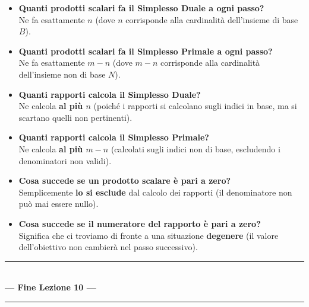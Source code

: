 \documentclass[12pt, a4paper]{article}
\begin{document}
	\begin{itemize}[label=\textcolor{titlecolor}{\Large\textbullet}, itemsep=6pt, leftmargin=1.5cm]
		\item \textbf{Quanti prodotti scalari fa il Simplesso Duale a ogni passo?} \\
		Ne fa esattamente \textbf{$n$} (dove $n$ corrisponde alla cardinalità dell'insieme di base $B$).
		
		\item \textbf{Quanti prodotti scalari fa il Simplesso Primale a ogni passo?} \\
		Ne fa esattamente \textbf{$m - n$} (dove $m - n$ corrisponde alla cardinalità dell'insieme non di base $N$).
		
		\item \textbf{Quanti rapporti calcola il Simplesso Duale?} \\
		Ne calcola \textbf{al più $n$} (poiché i rapporti si calcolano sugli indici in base, ma si scartano quelli non pertinenti).
		
		\item \textbf{Quanti rapporti calcola il Simplesso Primale?} \\
		Ne calcola \textbf{al più $m - n$} (calcolati sugli indici non di base, escludendo i denominatori non validi).
		
		\item \textbf{Cosa succede se un prodotto scalare è pari a zero?} \\
		Semplicemente \textbf{lo si esclude} dal calcolo dei rapporti (il denominatore non può mai essere nullo).
		
		\item \textbf{Cosa succede se il numeratore del rapporto è pari a zero?} \\
		Significa che ci troviamo di fronte a una situazione \textbf{degenere} (il valore dell'obiettivo non cambierà nel passo successivo).
	\end{itemize}
	
	\vspace{1.5cm}
	\begin{center}
		\rule{0.65\textwidth}{1pt} \\
		\vspace{0.4cm}
		\textcolor{titlecolor}{\LARGE \textbf{--- Fine Lezione 10 ---}} \\
		\vspace{0.2cm}
		\rule{0.65\textwidth}{1pt}
	\end{center}
	\newpage
	
\end{document}
